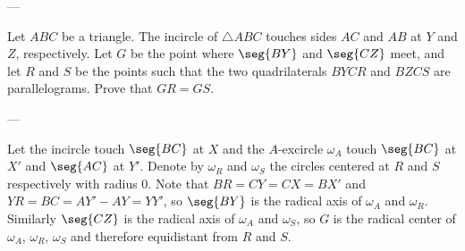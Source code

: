 
---

Let $ABC$ be a triangle. The incircle of $\triangle ABC$ touches sides $AC$ and $AB$ at $Y$ and $Z$, respectively. Let $G$ be the point where $\seg{BY}$ and $\seg{CZ}$ meet, and let $R$ and $S$ be the points such that the two quadrilaterals $BYCR$ and $BZCS$ are parallelograms. Prove that $GR=GS$.

---

Let the incircle touch $\seg{BC}$ at $X$ and the $A$-excircle $\omega_A$ touch $\seg{BC}$ at $X'$ and $\seg{AC}$ at $Y'$. Denote by $\omega_R$ and $\omega_S$ the circles centered at $R$ and $S$ respectively with radius $0$. Note that $BR=CY=CX=BX'$ and $YR=BC=AY'-AY=YY'$, so $\seg{BY}$ is the radical axis of $\omega_A$ and $\omega_R$. Similarly $\seg{CZ}$ is the radical axis of $\omega_A$ and $\omega_S$, so $G$ is the radical center of $\omega_A$, $\omega_R$, $\omega_S$ and therefore equidistant from $R$ and $S$.
